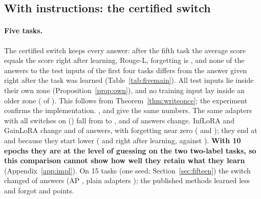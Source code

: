 \subsection{With instructions: the certified switch}
\label{sec:withinstr}

\begin{table}[!htbp]
  \caption{Five tasks, original instructions (T5-base, 10 epochs; re-test). Answers changed: test inputs of the first four tasks whose
  final answer differs from the answer right after learning; certified inputs: inputs inside a zone. Means over
  \FiveCertSeeds{} seeds (lowest and highest in brackets); counts summed over seeds.}
  \label{tab:fivemain}
  \centering
  \footnotesize
  \setlength{\tabcolsep}{3pt}
  
\end{table}

\paragraph{Five tasks.}\label{sec:five} The certified switch keeps every answer: after the fifth task the average score
equals the score right after learning, \FiveCertAP{} Rouge-L, forgetting is \FiveCertFT{}, and none of
the \FiveCertCompared{} answers to the test inputs of the first four tasks differs from the answer
given right after the task was learned (Table~\ref{tab:fivemain}). All \FiveCertInputsOne{} test inputs
lie inside their own zone (Proposition~\ref{prop:own}), and no training input lay inside an older zone
(\FiveCertBlocked{} of \FiveCertTrainInputs{}). This follows from Theorem~\ref{thm:writeonce}; the
experiment confirms the implementation. \nearest{}, \centre{} and \keyswitch{} give the same numbers.
The same adapters with all switches on (\plain{}) fall from \FivePlainLearned{} to \FivePlainAP{}, and
\FivePlainChanged{} of \FivePlainCompared{} answers change. InfLoRA and GainLoRA change \FiveInfChanged{}
and \FiveGainChanged{} of \FiveInfCompared{} answers, with forgetting near zero (\FiveInfFT{} and
\FiveGainFT{}); they end at \FiveInfAP{} and \FiveGainAP{} because they start lower
(\FiveInfLearned{} and \FiveGainLearned{} right after learning, against \FiveCertLearned{}).
\textbf{With 10 epochs they are at the level of guessing on the two two-label tasks, so this comparison
cannot show how well they retain what they learn} (Appendix~\ref{app:impl}). On 15 tasks (one seed; Section~\ref{sec:fifteen}) the switch changed
\FifteenCertChanged{} of \FifteenCertCompared{} answers (AP \FifteenCertAP{}, plain adapters
\FifteenPlainAP{}); the published methods learned less and forgot \FifteenInfFT{} and \FifteenGainFT{} points.

